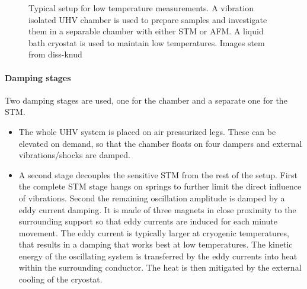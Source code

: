 \begin{figure}[ht]
{		\label{fig:STM-cryo}
	}
	\caption{Typical setup for low temperature measurements. A vibration isolated UHV chamber is used to prepare samples and investigate them in a separable chamber with either STM or AFM. A liquid bath cryostat is used to maintain low temperatures. Images stem from {diss-knud}}
	\label{fig:STM}
\end{figure}

\paragraph{Damping stages}
Two damping stages are used, one for the chamber and a separate one for the STM.
\begin{itemize}
	\item The whole UHV system is placed on air pressurized legs. These can be elevated on demand, so that the chamber floats on four dampers and external vibrations/shocks are damped.
	\item A second stage decouples the sensitive STM from the rest of the setup. First the complete STM stage hangs on springs to further limit the direct influence of vibrations. Second the remaining oscillation amplitude is damped by a eddy current damping. It is made of three magnets in close proximity to the surrounding support so that eddy currents are induced for each minute movement. The eddy current is typically larger at cryogenic temperatures, that results in a damping that works best at low temperatures. The kinetic energy of the oscillating system is transferred by the eddy currents into heat within the surrounding conductor. The heat is then mitigated by the external cooling of the cryostat.
\end{itemize}

